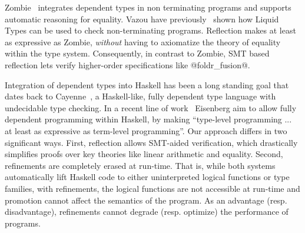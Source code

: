 %


%
Zombie~\citep{Zombie, Sjoberg2015} integrates
dependent types in non terminating programs
and supports automatic reasoning for equality.
%
Vazou \etal have previously~\citep{Vazou14} shown
how Liquid Types can be used to check
non-terminating programs.
%
Reflection makes \toolname at least as
expressive as Zombie, \emph{without}
having to axiomatize the theory of
equality within the type system.
%
Consequently, in contrast to Zombie,
SMT based reflection lets \toolname
verify higher-order specifications
like @foldr_fusion@.

%
%
%

%
Integration of dependent types into Haskell
has been a long standing goal that dates back
to Cayenne~\citep{cayenne}, a Haskell-like,
fully dependent type language with undecidable
type checking.
%
In a recent line of work~\citep{EisenbergS14}
Eisenberg \etal aim to allow fully dependent
programming within Haskell, by making
``type-level programming ... at least as
  expressive as term-level programming''.
%
Our approach differs in two significant ways.
%
First, reflection allows SMT-aided verification,
which drastically simplifies proofs over key theories
like linear arithmetic and equality.
%
Second, refinements are completely erased at run-time.
That is, while both systems automatically lift Haskell
code to either uninterpreted logical functions
or type families, with refinements, the logical
functions are not accessible at run-time and
promotion cannot affect the semantics of
the program.
%
As an advantage (resp. disadvantage), refinements
cannot degrade (resp. optimize)
the performance of programs.


